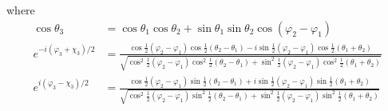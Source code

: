 where
\begin{align*}
    \cos\theta_3 &= 
    \cos\theta_1 \cos\theta_2 + \sin\theta_1 \sin\theta_2 \cos(\varphi_2 - \varphi_1) \\[0.2cm]
    e^{-i(\varphi_3+\chi_3)/2} &= 
    \frac{ \cos\tfrac{1}{2}(\varphi_2-\varphi_1) \cos\tfrac{1}{2}(\theta_2-\theta_1) 
    - i \sin\tfrac{1}{2}(\varphi_2-\varphi_1) \cos\tfrac{1}{2}(\theta_1+\theta_2) }{
    \sqrt{ \cos^2\tfrac{1}{2}(\varphi_2-\varphi_1) \cos^2\tfrac{1}{2}(\theta_2-\theta_1)
    + \sin^2\tfrac{1}{2}(\varphi_2-\varphi_1) \cos^2\tfrac{1}{2}(\theta_1+\theta_2)}} \\[0.15cm]
    e^{i(\varphi_3-\chi_3)/2} &= 
    \frac{ \cos\tfrac{1}{2}(\varphi_2-\varphi_1) \sin\tfrac{1}{2}(\theta_2-\theta_1) 
    + i \sin\tfrac{1}{2}(\varphi_2-\varphi_1) \sin\tfrac{1}{2}(\theta_1+\theta_2) }{
    \sqrt{ \cos^2\tfrac{1}{2}(\varphi_2-\varphi_1) \sin^2\tfrac{1}{2}(\theta_2-\theta_1)
    + \sin^2\tfrac{1}{2}(\varphi_2-\varphi_1) \sin^2\tfrac{1}{2}(\theta_1+\theta_2)}} \\[0.15cm]
\end{align*}

\clearpage